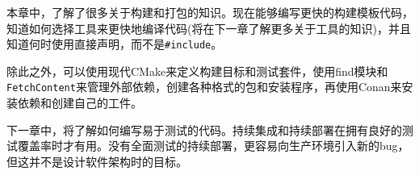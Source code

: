 本章中，了解了很多关于构建和打包的知识。现在能够编写更快的构建模板代码，知道如何选择工具来更快地编译代码(将在下一章了解更多关于工具的知识)，并且知道何时使用直接声明，而不是\texttt{\#include}。

除此之外，可以使用现代CMake来定义构建目标和测试套件，使用find模块和\texttt{FetchContent}来管理外部依赖，创建各种格式的包和安装程序，再使用Conan来安装依赖和创建自己的工件。

下一章中，将了解如何编写易于测试的代码。持续集成和持续部署在拥有良好的测试覆盖率时才有用。没有全面测试的持续部署，更容易向生产环境引入新的bug，但这并不是设计软件架构时的目标。